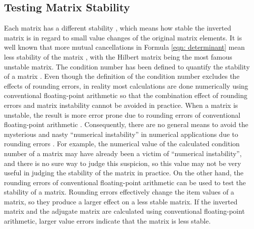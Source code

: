 \documentclass[twoside]{article}
\numberwithin{equation}{section}
\begin{document}
\subsection{Testing Matrix Stability}

Each matrix has a different stability \cite{Condition_Number}, which means how stable the inverted matrix is in regard to small value changes of the original matrix elements.  It is well known that more mutual cancellations in Formula \eqref{eqn: determinant} mean less stability of the matrix \cite{Arithmetic_Digital_Computers}\cite{Numerical_Recipes}, with the Hilbert matrix \cite{Hilbert_Matrix} being the most famous unstable matrix.  The condition number has been defined to quantify the stability of a matrix \cite{Condition_Number}.  Even though the definition of the condition number excludes the effects of rounding errors, in reality most calculations are done numerically using conventional floating-point arithmetic so that the combination effect of rounding errors and matrix instability cannot be avoided in practice.  When a matrix is unstable, the result is more error prone due to rounding errors of conventional floating-point arithmetic \cite{Arithmetic_Digital_Computers}.  Consequently, there are no general means to avoid the mysterious and nasty ``numerical instability'' in numerical applications due to rounding errors \cite{Arithmetic_Digital_Computers}.  For example, the numerical value of the calculated condition number of a matrix may have already been a victim of ``numerical instability'', and there is no sure way to judge this suspicion, so this value may not be very useful in judging the stability of the matrix in practice.  On the other hand, the rounding errors of conventional floating-point arithmetic can be used to test the stability of a matrix.  Rounding errors effectively change the item values of a matrix, so they produce a larger effect on a less stable matrix.  If the inverted matrix and the adjugate matrix are calculated using conventional floating-point arithmetic, larger value errors indicate that the matrix is less stable.
\end{document}
